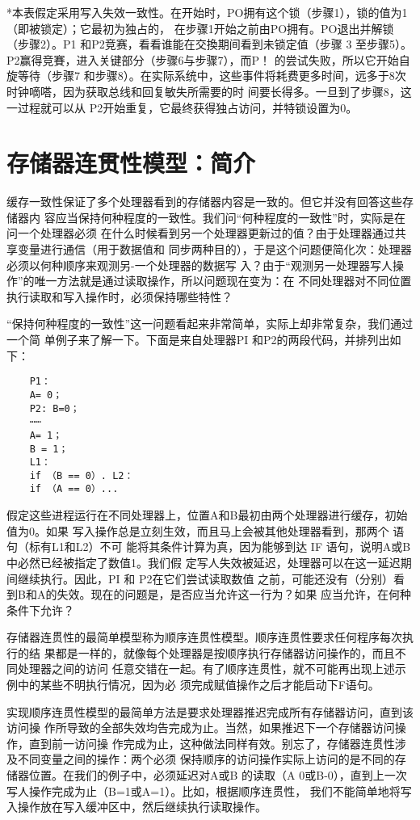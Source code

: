 *本表假定采用写入失效一致性。在开始时，PO拥有这个锁（步骤1），锁的值为1（即被锁定）；它最初为独占的，
在步骤1开始之前由PO拥有。PO退出并解锁（步骤2）。P1 和P2竞赛，看看谁能在交換期间看到未锁定值（步骤
3 至步骤5）。P2赢得竞賽，进入关键部分（步骤6与步骤7），而P！ 的尝试失败，所以它开始自旋等待（步骤7
和步骤8）。在实际系统中，这些事件将耗费更多时间，远多于8次时钟嘀嗒，因为获取总线和回复敏失所需要的时
间要长得多。一旦到了步骤8，这一过程就可以从 P2开始重复，它最终获得独占访问，并特锁设置为0。

\section{存储器连贯性模型：简介}
缓存一致性保证了多个处理器看到的存储器内容是一致的。但它并没有回答这些存储器内
容应当保持何种程度的一致性。我们问“何种程度的一致性”时，实际是在问一个处理器必须
在什么时候看到另一个处理器更新过的值？由于处理器通过共享变量进行通信（用于数据值和
同步两种目的），于是这个问题便简化次：处理器必须以何种顺序来观测另-一个处理器的数据写
入？由于“观测另一处理器写人操作”的唯一方法就是通过读取操作，所以问题现在变为：在
不同处理器对不同位置执行读取和写入操作时，必须保持哪些特性？

“保持何种程度的一致性”这一问题看起来非常简单，实际上却非常复杂，我们通过一个简
单例子来了解一下。下面是来自处理器PI 和P2的两段代码，并排列出如下：

\begin{verbatim}
    P1：
    A= 0；
    P2: B=0；
    ⋯⋯
    A= 1；
    B = 1；
    L1：
    if （B == 0）. L2：
    if （A == 0）...
\end{verbatim}
假定这些进程运行在不同处理器上，位置A和B最初由两个处理器进行缓存，初始值为0。如果
写入操作总是立刻生效，而且马上会被其他处理器看到，那两个 语句（标有L1和L2）不可
能将其条件计算为真，因为能够到达 IF 语句，说明A或B中必然已经被指定了数值1。我们假
定写人失效被延迟，处理器可以在这一延迟期间继续执行。因此，PI 和 P2在它们尝试读取数值
之前，可能还没有（分别）看到B和A的失效。现在的问题是，是否应当允许这一行为？如果
应当允许，在何种条件下允许？

存储器连贯性的最简单模型称为顺序连贯性模型。顺序连贯性要求任何程序每次执行的结
果都是一样的，就像每个处理器是按顺序执行存储器访问操作的，而且不同处理器之间的访问
任意交错在一起。有了顺序连贯性，就不可能再出现上述示例中的某些不明执行情况，因为必
须完成赋值操作之后才能启动下F语句。

实现顺序连贯性模型的最简单方法是要求处理器推迟完成所有存储器访问，直到该访问操
作所导致的全部失效均告完成为止。当然，如果推迟下一个存储器访问操作，直到前一访问操
作完成为止，这种做法同样有效。别忘了，存储器连贯性涉及不同变量之间的操作：两个必须
保持顺序的访问操作实际上访问的是不同的存储器位置。在我们的例子中，必须延迟对A或B
的读取（A 0或B-0），直到上一次写人操作完成为止（B=1或A=1）。比如，根据顺序连贯性，
我们不能简单地将写入操作放在写入缓冲区中，然后继续执行读取操作。

